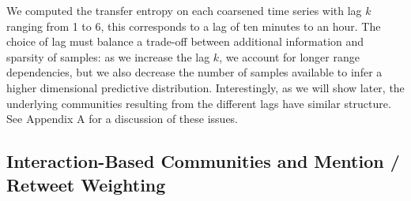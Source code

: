  We computed the transfer entropy on each coarsened time series with lag $k$ ranging from 1 to 6, this corresponds to a lag of ten minutes to an hour. The choice of lag must balance a trade-off between additional information and sparsity of samples: as we increase the lag $k$, we account for longer range dependencies, but we also decrease the number of samples available to infer a higher dimensional predictive distribution.  Interestingly, as we will show later, the underlying communities resulting from the different lags have similar structure.  See Appendix A for a discussion of these issues.

\subsection{Interaction-Based Communities and Mention / Retweet Weighting}
\label{sec:method-interaction}

